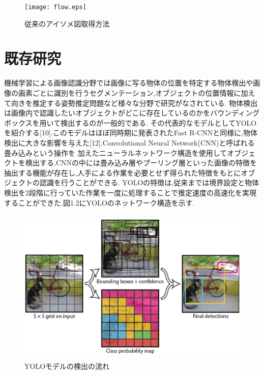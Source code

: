 \begin{figure}[htbt]
	\centering
	 \texttt{[image: flow.eps]}
	 \caption{従来のアイソメ図取得方法}
	 \label{fig:f2}
\end{figure}

\section{既存研究}
機械学習による画像認識分野では画像に写る物体の位置を特定する物体検出や画像の画素ごとに識別を行うセグメンテーション,オブジェクトの位置情報に加えて向きを推定する姿勢推定問題など様々な分野で研究がなされている.
物体検出は画像内で認識したいオブジェクトがどこに存在しているのかをバウンディングボックスを用いて検出するのが一般的である.
その代表的なモデルとしてYOLOを紹介する[10].このモデルはほぼ同時期に発表されたFast R-CNNと同様に,物体検出に大きな影響を与えた[12].Convolutional Neural Network(CNN)と呼ばれる畳み込みという操作を
加えたニューラルネットワーク構造を使用してオブジェクトを検出する.CNNの中には畳み込み層やプーリング層といった画像の特徴を抽出する機能が存在し,人手による作業を必要とせず得られた特徴をもとにオブジェクトの認識を行うことができる.
YOLOの特徴は,従来までは境界設定と物体検出を2段階に行っていた作業を一度に処理することで推定速度の高速化を実現することができた.図1.2にYOLOのネットワーク構造を示す.\\
\begin{figure}[htbt]
	\centering
	 \includegraphics[height=75mm]{yolo.eps}
	 \caption{YOLOモデルの検出の流れ}
	 \label{fig:f2}
\end{figure}

